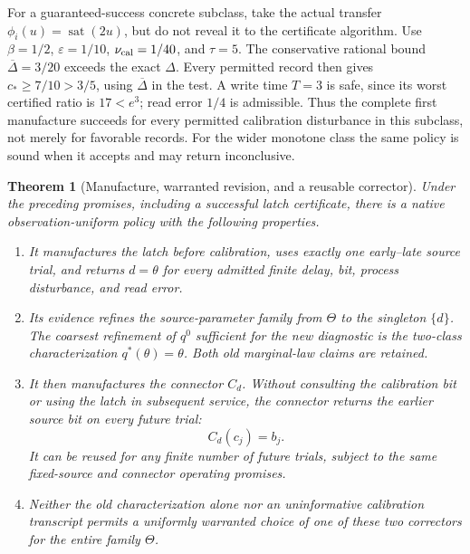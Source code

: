 \documentclass[11pt]{article}
\newtheorem{theorem}{Theorem}[section]
\theoremstyle{definition}
\theoremstyle{remark}
\begin{document}
For a guaranteed-success concrete subclass, take the actual transfer
$\phi_i(u)=\operatorname{sat}(2u)$, but do not reveal it to the certificate
algorithm. Use $\beta=1/2$, $\varepsilon=1/10$,
$\nu_{\rm cal}=1/40$, and $\tau=5$. The conservative rational bound
$\overline\Delta=3/20$ exceeds the exact $\Delta$. Every permitted record
then gives $c_*\geq7/10>3/5$, using $\overline\Delta$ in the test. A write
time $T=3$ is safe, since its worst certified ratio is $17<e^3$; read
error $1/4$ is admissible. Thus the complete first manufacture succeeds
for every permitted calibration disturbance in this subclass, not merely
for favorable records. For the wider monotone class the same policy is
sound when it accepts and may return inconclusive.

\begin{theorem}[Manufacture, warranted revision, and a reusable corrector]
\label{arc:thm:corrector}
Under the preceding promises, including a successful latch certificate,
there is a native observation-uniform policy
with the following properties.
\begin{enumerate}
\item It manufactures the latch before calibration, uses exactly one
early--late source trial, and returns $d=\theta$ for every admitted finite
delay, bit, process disturbance, and read error.
\item Its evidence refines the source-parameter family from $\Theta$ to the
singleton $\{d\}$. The coarsest refinement of $q^0$ sufficient for the
new diagnostic is the two-class characterization $q^*(\theta)=\theta$.
Both old marginal-law claims are retained.
\item It then manufactures the connector $C_d$. Without consulting the calibration bit or using the latch in subsequent
service,
the connector returns the earlier source bit on every future trial:
\[
                         C_d(c_j)=b_j.
\]
It can be reused for any finite number of future trials, subject to the
same fixed-source and connector operating promises.
\item Neither the old characterization alone nor an uninformative
calibration transcript permits a uniformly warranted choice of one of
these two correctors for the entire family $\Theta$.
\end{enumerate}
\end{theorem}
\end{document}
